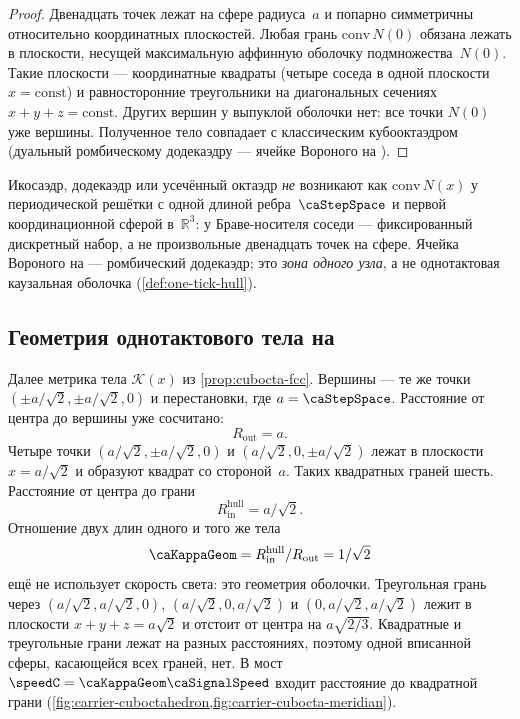 \begin{proof}
Двенадцать точек лежат на сфере радиуса~$a$ и попарно симметричны относительно координатных плоскостей.
Любая грань $\mathrm{conv}\,N(0)$ обязана лежать в плоскости, несущей максимальную аффинную оболочку подмножества~$N(0)$.
Такие плоскости --- координатные квадраты (четыре соседа в одной плоскости $x=\mathrm{const}$)
и равносторонние треугольники на диагональных сечениях $x+y+z=\mathrm{const}$.
Других вершин у выпуклой оболочки нет: все точки $N(0)$ уже вершины.
Полученное тело совпадает с классическим кубооктаэдром (дуальный ромбическому додекаэдру --- ячейке Вороного на \latGCKshort).
\end{proof}

\begin{remark}
Икосаэдр, додекаэдр или усечённый октаэдр \emph{не} возникают как $\mathrm{conv}\,N(x)$ у периодической решётки
с одной длиной ребра~$\caStepSpace$ и первой координационной сферой в~$\mathbb{R}^3$:
у Браве-носителя соседи --- фиксированный дискретный набор, а не произвольные двенадцать точек на сфере.
Ячейка Вороного на \latGCKshort --- ромбический додекаэдр; это \emph{зона одного узла}, а не однотактовая каузальная оболочка (\cref{def:one-tick-hull}).
\end{remark}

\subsection{Геометрия однотактового тела на \latGCKshort}
\label{sec:fcc-kappa}

Далее метрика тела $\mathcal{K}(x)$ из \cref{prop:cubocta-fcc}.
Вершины --- те же точки $(\pm a/\sqrt{2},\pm a/\sqrt{2},0)$ и перестановки, где $a=\caStepSpace$.
Расстояние от центра до вершины уже сосчитано:
\[
  R_{\mathrm{out}}=a.
\]
Четыре точки $(a/\sqrt{2},\pm a/\sqrt{2},0)$ и $(a/\sqrt{2},0,\pm a/\sqrt{2})$ лежат в плоскости $x=a/\sqrt{2}$ и образуют квадрат со стороной~$a$.
Таких квадратных граней шесть.
Расстояние от центра до грани
\[
  R_{\mathrm{in}}^{\mathrm{hull}}=a/\sqrt{2}.
\]
Отношение двух длин одного и того же тела
\[
  \caKappaGeom=R_{\mathrm{in}}^{\mathrm{hull}}/R_{\mathrm{out}}=1/\sqrt{2}
\]
ещё не использует скорость света: это геометрия оболочки.
Треугольная грань через $(a/\sqrt{2},a/\sqrt{2},0)$, $(a/\sqrt{2},0,a/\sqrt{2})$ и $(0,a/\sqrt{2},a/\sqrt{2})$ лежит в плоскости $x+y+z=a\sqrt{2}$ и отстоит от центра на $a\sqrt{2/3}$.
Квадратные и треугольные грани лежат на разных расстояниях, поэтому одной вписанной сферы, касающейся всех граней, нет.
В мост $\speedC=\caKappaGeom \caSignalSpeed$ входит расстояние до квадратной грани
(\cref{fig:carrier-cuboctahedron,fig:carrier-cubocta-meridian}).

